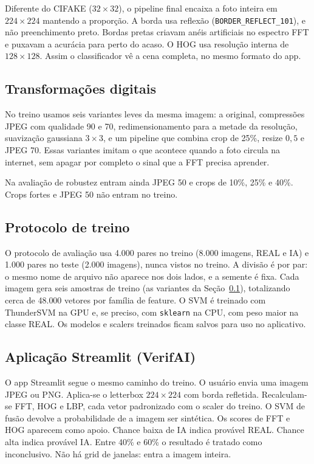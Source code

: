 \documentclass[12pt]{article}
\begin{document}
Diferente do CIFAKE ($32{\times}32$), o pipeline final encaixa a foto inteira em $224{\times}224$ mantendo a proporção. A borda usa reflexão (\texttt{BORDER\_REFLECT\_101}), e não preenchimento preto. Bordas pretas criavam anéis artificiais no espectro FFT e puxavam a acurácia para perto do acaso. O HOG usa resolução interna de $128{\times}128$. Assim o classificador vê a cena completa, no mesmo formato do app.

\subsection{Transformações digitais}
\label{sec:transformacoes}

No treino usamos seis variantes leves da mesma imagem: a original, compressões JPEG com qualidade 90 e 70, redimensionamento para a metade da resolução, suavização gaussiana $3{\times}3$, e um pipeline que combina crop de 25\%, resize $0{,}5$ e JPEG 70. Essas variantes imitam o que acontece quando a foto circula na internet, sem apagar por completo o sinal que a FFT precisa aprender.

Na avaliação de robustez entram ainda JPEG 50 e crops de 10\%, 25\% e 40\%. Crops fortes e JPEG 50 não entram no treino.

\subsection{Protocolo de treino}

O protocolo de avaliação usa 4{.}000 pares no treino (8{.}000 imagens, REAL e IA) e 1{.}000 pares no teste (2{.}000 imagens), nunca vistos no treino. A divisão é por par: o mesmo nome de arquivo não aparece nos dois lados, e a semente é fixa. Cada imagem gera seis amostras de treino (as variantes da Seção~\ref{sec:transformacoes}), totalizando cerca de 48{.}000 vetores por família de feature. O SVM é treinado com ThunderSVM na GPU e, se preciso, com \texttt{sklearn} na CPU, com peso maior na classe REAL. Os modelos e scalers treinados ficam salvos para uso no aplicativo.

\subsection{Aplicação Streamlit (VerifAI)}

O app Streamlit segue o mesmo caminho do treino. O usuário envia uma imagem JPEG ou PNG. Aplica-se o letterbox $224{\times}224$ com borda refletida. Recalculam-se FFT, HOG e LBP, cada vetor padronizado com o scaler do treino. O SVM de fusão devolve a probabilidade de a imagem ser sintética. Os scores de FFT e HOG aparecem como apoio. Chance baixa de IA indica provável REAL. Chance alta indica provável IA. Entre 40\% e 60\% o resultado é tratado como inconclusivo. Não há grid de janelas: entra a imagem inteira.
\end{document}
